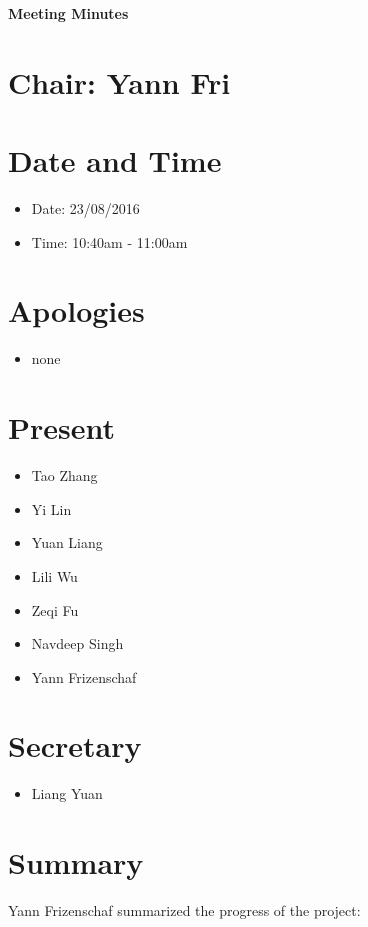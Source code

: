 \documentclass[11pt, a4paper]{article}
\begin{document}
\vspace*{15pt}
\begin{center}
\huge \bf Meeting Minutes
\end{center}

\section*{Chair: Yann Fri}
\vspace*{10pt}

\section{Date and Time}
\begin{itemize}
\item Date: 23/08/2016
\item Time: 10:40am - 11:00am
\end{itemize}

\section{Apologies}
\begin{itemize}
\item none
\end{itemize}

\section{Present}
\begin{itemize}
\item Tao Zhang
\item Yi Lin
\item Yuan Liang
\item Lili Wu
\item Zeqi Fu
\item Navdeep Singh
\item Yann Frizenschaf
\end{itemize}

\section{Secretary}
\begin{itemize}
\item Liang Yuan
\end{itemize}

\section{Summary }
Yann Frizenschaf summarized the progress of the project:
\end{document}
